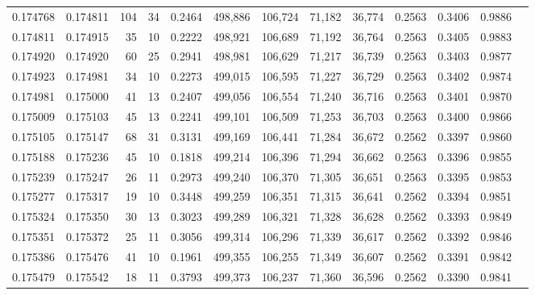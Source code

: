 \begin{tabular}{rrrrrrrrrrrrr}
0.174768 & 0.174811 &   104 &  34 &                                     0.2464 & 498,886 & 106,724 &  71,182 &  36,774 & 0.2563 & 0.3406 & 0.9886 \\
0.174811 & 0.174915 &    35 &  10 &                                     0.2222 & 498,921 & 106,689 &  71,192 &  36,764 & 0.2563 & 0.3405 & 0.9883 \\
0.174920 & 0.174920 &    60 &  25 &                                     0.2941 & 498,981 & 106,629 &  71,217 &  36,739 & 0.2563 & 0.3403 & 0.9877 \\
0.174923 & 0.174981 &    34 &  10 &                                     0.2273 & 499,015 & 106,595 &  71,227 &  36,729 & 0.2563 & 0.3402 & 0.9874 \\
0.174981 & 0.175000 &    41 &  13 &                                     0.2407 & 499,056 & 106,554 &  71,240 &  36,716 & 0.2563 & 0.3401 & 0.9870 \\
0.175009 & 0.175103 &    45 &  13 &                                     0.2241 & 499,101 & 106,509 &  71,253 &  36,703 & 0.2563 & 0.3400 & 0.9866 \\
0.175105 & 0.175147 &    68 &  31 &                                     0.3131 & 499,169 & 106,441 &  71,284 &  36,672 & 0.2562 & 0.3397 & 0.9860 \\
0.175188 & 0.175236 &    45 &  10 &                                     0.1818 & 499,214 & 106,396 &  71,294 &  36,662 & 0.2563 & 0.3396 & 0.9855 \\
0.175239 & 0.175247 &    26 &  11 &                                     0.2973 & 499,240 & 106,370 &  71,305 &  36,651 & 0.2563 & 0.3395 & 0.9853 \\
0.175277 & 0.175317 &    19 &  10 &                                     0.3448 & 499,259 & 106,351 &  71,315 &  36,641 & 0.2562 & 0.3394 & 0.9851 \\
0.175324 & 0.175350 &    30 &  13 &                                     0.3023 & 499,289 & 106,321 &  71,328 &  36,628 & 0.2562 & 0.3393 & 0.9849 \\
0.175351 & 0.175372 &    25 &  11 &                                     0.3056 & 499,314 & 106,296 &  71,339 &  36,617 & 0.2562 & 0.3392 & 0.9846 \\
0.175386 & 0.175476 &    41 &  10 &                                     0.1961 & 499,355 & 106,255 &  71,349 &  36,607 & 0.2562 & 0.3391 & 0.9842 \\
0.175479 & 0.175542 &    18 &  11 &                                     0.3793 & 499,373 & 106,237 &  71,360 &  36,596 & 0.2562 & 0.3390 & 0.9841 \\

\end{tabular}
